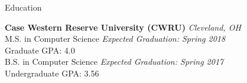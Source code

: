\documentclass{resume} %
\begin{document}

\begin{rSection}{Education}

{\bf Case Western Reserve University (CWRU)} \hfill {\em Cleveland, OH} \\
M.S. in Computer Science \hfill {\em Expected Graduation: Spring 2018}\\ 
\setlength\parindent{24pt} \indent Graduate GPA: 4.0 \\
B.S. in Computer Science \hfill {\em Expected Graduation: Spring 2017}\\
\setlength\parindent{24pt} \indent Undergraduate GPA: 3.56

\end{rSection}


\end{document}
